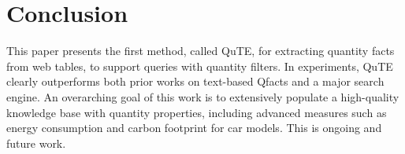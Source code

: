 

\section{Conclusion}
This paper presents the first method, called QuTE, for
extracting quantity facts from web tables,
to support queries with quantity filters.
In experiments, QuTE clearly outperforms both prior works
on text-based Qfacts and a major search engine.
An overarching goal of this work is to extensively
populate a high-quality knowledge base with quantity properties,
including advanced measures such as energy consumption
and carbon footprint for car models.
This is ongoing and future work.



